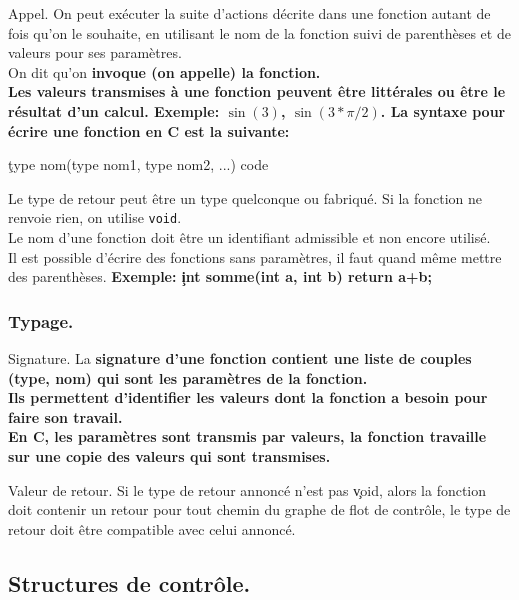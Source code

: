 \documentclass[french, 11pt]{article}
\begin{document}
\begin{defi}{Appel.}{}
    On peut exécuter la suite d'actions décrite dans une fonction autant de fois qu'on le souhaite, en utilisant le nom de la fonction suivi de parenthèses et de valeurs pour ses paramètres.\\
    On dit qu'on \bf{invoque} (on appelle) la fonction.\\
    Les valeurs transmises à une fonction peuvent être littérales ou être le résultat d'un calcul.\n
    \bf{Exemple:} $\sin(3)$, $\sin(3*\pi/2)$.\n
    La syntaxe pour écrire une fonction en C est la suivante:
    \begin{center}
        \c{type nom(type nom1, type nom2, ...) { code }}
    \end{center}
    Le type de retour peut être un type quelconque ou fabriqué. Si la fonction ne renvoie rien, on utilise \texttt{void}.\\
    Le nom d'une fonction doit être un identifiant admissible et non encore utilisé.\\
    Il est possible d'écrire des fonctions sans paramètres, il faut quand même mettre des parenthèses.\n
    \bf{Exemple:} \c{int somme(int a, int b) { return a+b; }}
\end{defi}

\subsubsection{Typage.}

\begin{defi}{Signature.}{}
    La \bf{signature} d'une fonction contient une liste de couples (type, nom) qui sont les paramètres de la fonction.\\
    Ils permettent d'identifier les valeurs dont la fonction a besoin pour faire son travail.\\
    En C, les paramètres sont transmis par valeurs, la fonction travaille sur une copie des valeurs qui sont transmises.
\end{defi}

\begin{defi}{Valeur de retour.}{}
    Si le type de retour annoncé n'est pas \c{void}, alors la fonction doit contenir un retour pour tout chemin du graphe de flot de contrôle, le type de retour doit être compatible avec celui annoncé.
\end{defi}

\subsection{Structures de contrôle.}
\end{document}

